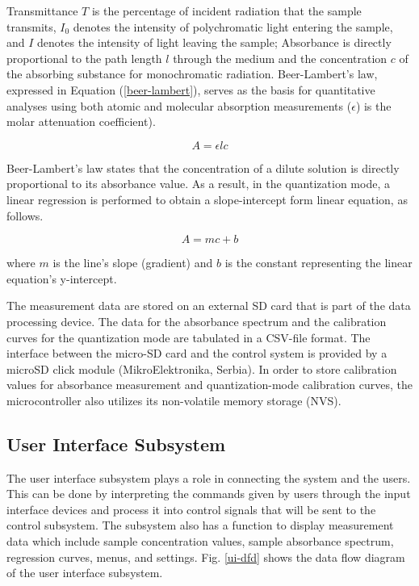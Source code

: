 \documentclass[conference]{IEEEtran}
\begin{document}
Transmittance $T$ is the percentage of incident radiation that the sample transmits, $I_0$ denotes the intensity of polychromatic light entering the sample, and $I$ denotes the intensity of light leaving the sample;
Absorbance is directly proportional to the path length $l$ through the medium and the concentration $c$ of the absorbing substance for monochromatic radiation.
Beer-Lambert's law, expressed in Equation (\ref{beer-lambert}), serves as the basis for quantitative analyses using both atomic and molecular absorption measurements ($\epsilon$) is the molar attenuation coefficient)\cite{b6}.

    \begin{equation}
    A={\epsilon}{l}{c}
    \label{beer-lambert}
    \end{equation}

Beer-Lambert's law states that the concentration of a dilute solution is directly proportional to its absorbance value.
As a result, in the quantization mode, a linear regression is performed to obtain a slope-intercept form linear equation, as follows. 

    \begin{equation}
    A={m}{c}+{b}
    \label{linear-eq}
    \end{equation}

where $m$ is the line's slope (gradient) and $b$ is the constant representing the linear equation's y-intercept.

The measurement data are stored on an external SD card that is part of the data processing device.
The data for the absorbance spectrum and the calibration curves for the quantization mode are tabulated in a CSV-file format.
The interface between the micro-SD card and the control system is provided by a microSD click module (MikroElektronika, Serbia).
In order to store calibration values for absorbance measurement and quantization-mode calibration curves, the microcontroller also utilizes its non-volatile memory storage (NVS).

\subsection{User Interface Subsystem}
The user interface subsystem plays a role in connecting the system and the users.
This can be done by interpreting the commands given by users through the input interface devices and process it into control signals that will be sent to the control subsystem.
The subsystem also has a function to display measurement data which include sample concentration values, sample absorbance spectrum, regression curves, menus, and settings.
Fig. \ref{ui-dfd} shows the data flow diagram of the user interface subsystem.
\end{document}
